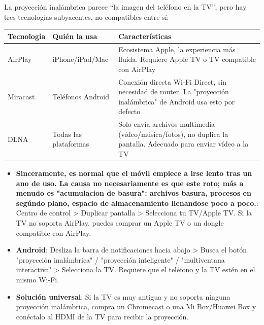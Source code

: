 


La proyección inalámbrica parece “la imagen del teléfono en la TV”, pero hay tres tecnologías subyacentes, no compatibles entre sí:

\begin{center}
\begin{tabularx}{\linewidth}{|X|X|X|}
\hline
\textbf{Tecnología} & \textbf{Quién la usa} & \textbf{Características} \tabularnewline
\hline
AirPlay & iPhone/iPad/Mac & Ecosistema Apple, la experiencia más fluida. Requiere Apple TV o TV compatible con AirPlay \tabularnewline
Miracast & Teléfonos Android & Conexión directa Wi-Fi Direct, sin necesidad de router. La "proyección inalámbrica" de Android usa esto por defecto \tabularnewline
DLNA & Todas las plataformas & Solo envía archivos multimedia (vídeo/música/fotos), no duplica la pantalla. Adecuado para enviar vídeo a la TV \tabularnewline
\hline
\end{tabularx}
\end{center}


\begin{itemize}
  \item \textbf{Sinceramente, es normal que el móvil empiece a irse lento tras un ano de uso. La causa no necesariamente es que este roto; más a menudo es "acumulacion de basura": archivos basura, procesos en segúndo plano, espacio de almacenamiento llenandose poco a poco.}: Centro de control > Duplicar pantalla > Selecciona tu TV/Apple TV. Si la TV no soporta AirPlay, puedes comprar un Apple TV o un dongle compatible con AirPlay.
  \item \textbf{Android}: Desliza la barra de notificaciones hacia abajo > Busca el botón "proyección inalámbrica" / "proyección inteligente" / "multiventana interactiva" > Selecciona la TV. Requiere que el teléfono y la TV estén en el mismo Wi-Fi.
  \item \textbf{Solución universal}: Si la TV es muy antigua y no soporta ninguna proyección inalámbrica, compra un Chromecast o una Mi Box/Huawei Box y conéctalo al HDMI de la TV para recibir la proyección.
\end{itemize}

